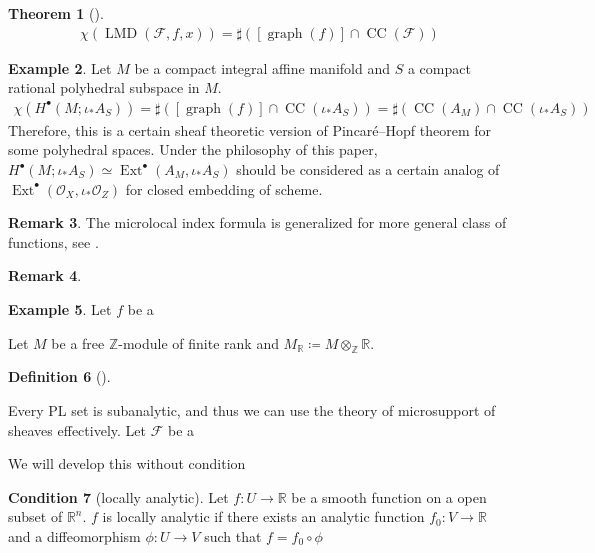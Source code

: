 \documentclass[a4paper,dvipdfmx,reqno,12pt]{amsart}
\theoremstyle{definition}
\newtheorem{Thm}{Theorem}[section]
\newtheorem{Def}[Thm]{Definition}
\newtheorem{Eg}[Thm]{Example}
\newtheorem{Rmk}[Thm]{Remark}
\newtheorem{Cond}[Thm]{Condition}
\newcommand{\deq}{\coloneqq}
\newcommand{\R}{\mathbb{R}}%
\newcommand{\Z}{\mathbb{Z}}%
\newcommand{\mcal}[1]{\mathcal{#1}}%
\newcommand{\opn}[1]{\operatorname{#1}}
\numberwithin{equation}{section}
\begin{document}
\begin{Thm}[{\cite[Theorem 9.5.6]{MR1299726}}]

\begin{align}
\chi(\opn{LMD}(\mcal{F},f,x))
=\sharp ([\opn{graph}(f)]\cap \opn{CC}(\mcal{F}))
\end{align}
\end{Thm}

\begin{Eg}
Let $M$ be a compact integral affine manifold and $S$  
a compact rational polyhedral subspace in $M$. 
\begin{align}
\chi(H^{\bullet}(M;\iota_*A_S))
=\sharp ([\opn{graph}(f)]\cap \opn{CC}(\iota_* A_S))
=\sharp (\opn{CC}(A_M)\cap \opn{CC}(\iota_* A_S))
\end{align}
Therefore, this is a certain sheaf theoretic version of 
Pincar\'e--Hopf theorem for some polyhedral spaces. Under
the philosophy of this paper, $H^{\bullet}(M;\iota_*A_S)\simeq 
\opn{Ext}^{\bullet}(A_M,\iota_*A_S)$
 should be considered as a
certain analog of 
$\opn{Ext}^{\bullet}(\mcal{O}_X,\iota_*\mcal{O}_Z)$ for closed embedding of 
scheme.
\end{Eg}

\begin{Rmk}
The microlocal index formula is generalized for more general 
class of functions, see \cite{}.
\end{Rmk}



\begin{Rmk}

\end{Rmk}

\begin{Eg}
Let $f$ be a 


\end{Eg}

Let $M$ be a free $\Z$-module of finite rank and 
$M_{\R}\deq M\otimes_{\Z}\R$.

\begin{Def}[{\cite{MR4294126}}]

\end{Def}

Every PL set is subanalytic, and thus 
we can use the theory of microsupport of sheaves
effectively.
Let $\mcal{F}$ be a 

We will develop this without condition 

\begin{Cond}[{locally analytic}]
Let 
$f\colon U \to \R$ be a smooth function on a open subset of $\R^{n}$.
$f$ is locally analytic if there exists an analytic function
$f_0\colon V\to \R$ and a diffeomorphism $\phi\colon U \to V$ such 
that $f=f_0\circ \phi $
\end{Cond}
\end{document}
